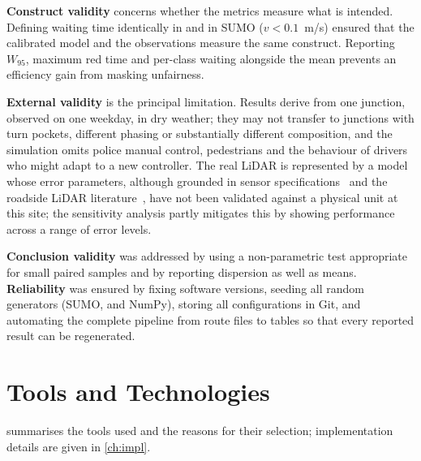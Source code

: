 \textbf{Construct validity} concerns whether the metrics measure what is intended. Defining waiting time identically in \dtx{} and in SUMO ($v < 0.1$~m/s) ensured that the calibrated model and the observations measure the same construct. Reporting $W_{95}$, maximum red time and per-class waiting alongside the mean prevents an efficiency gain from masking unfairness.

\textbf{External validity} is the principal limitation. Results derive from one junction, observed on one weekday, in dry weather; they may not transfer to junctions with turn pockets, different phasing or substantially different composition, and the simulation omits police manual control, pedestrians and the behaviour of drivers who might adapt to a new controller. The real LiDAR is represented by a model whose error parameters, although grounded in sensor specifications~\cite{ouster_os1} and the roadside LiDAR literature~\cite{zhao2019lidar}, have not been validated against a physical unit at this site; the sensitivity analysis partly mitigates this by showing performance across a range of error levels.

\textbf{Conclusion validity} was addressed by using a non-parametric test appropriate for small paired samples and by reporting dispersion as well as means. \textbf{Reliability} was ensured by fixing software versions, seeding all random generators (SUMO, \vls{} and NumPy), storing all configurations in Git, and automating the complete pipeline from route files to tables so that every reported result can be regenerated.

\section{Tools and Technologies}\label{sec:method-tools}

 summarises the tools used and the reasons for their selection; implementation details are given in \cref{ch:impl}.

